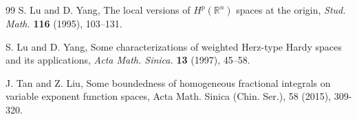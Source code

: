 \documentclass[oneside,reqno]{amsart}
\numberwithin{equation}{section}
\theoremstyle{definition}
\begin{document}
\begin{thebibliography}{99}
S. Lu and D. Yang, The local versions of $H^p(\mathbb{R}^n)$ spaces at the origin, \textit{Stud. Math.} {\bf 116} (1995),  103–131.





S. Lu and D. Yang, Some characterizations of weighted Herz-type Hardy spaces and its applications, \textit{ Acta Math. Sinica.} {\bf 13} (1997), 45–58. 

J. Tan and Z. Liu, Some boundedness of homogeneous fractional integrals on variable exponent function
spaces, Acta Math. Sinica (Chin. Ser.), 58 (2015), 309-320.

\end{thebibliography}
\end{document}
